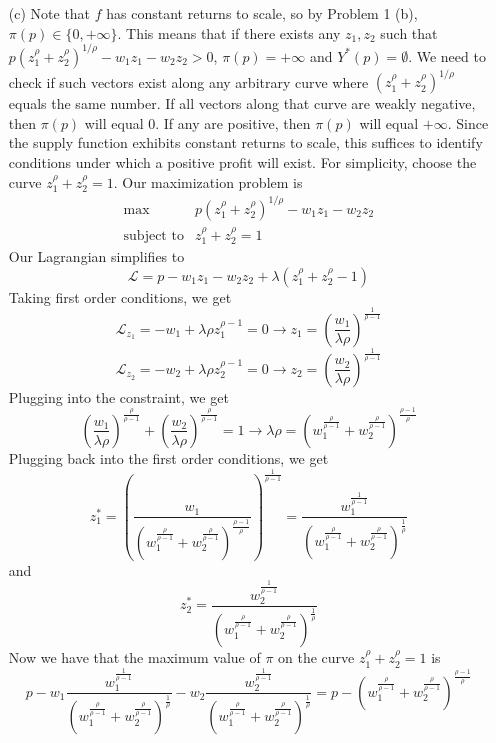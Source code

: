 \documentclass[12pt]{article}
\begin{document}
\begin{itemize}
    \item[(c)] Note that $f$ has constant returns to scale, so by Problem 1 (b), $\pi(p) \in \{0,+\infty\}$. This means that if there exists any $z_1,z_2$ such that $p(z_1^\rho + z_2^\rho)^{1/\rho} - w_1z_1 - w_2z_2 > 0$, $\pi(p) = +\infty$ and $Y^*(p) = \emptyset$. We need to check if such vectors exist along any arbitrary curve where $(z_1^\rho + z_2^\rho)^{1/\rho}$ equals the same number. If all vectors along that curve are weakly negative, then $\pi(p)$ will equal 0. If any are positive, then $\pi(p)$ will equal $+\infty$. Since the supply function exhibits constant returns to scale, this suffices to identify conditions under which a positive profit will exist. For simplicity, choose the curve $z_1^\rho + z_2^\rho = 1$. Our maximization problem is
    \[
    \begin{array}{ll}
        \text{max} & p(z_1^\rho + z_2^\rho)^{1/\rho} - w_1z_1 - w_2z_2 \\
        \text{subject to} & z_1^\rho + z_2^\rho = 1
    \end{array}
    \]
    Our Lagrangian simplifies to
    \[
    \mathcal{L} = p - w_1z_1 - w_2z_2 + \lambda(z_1^\rho + z_2^\rho - 1)
    \]
    Taking first order conditions, we get
    \[
    \mathcal{L}_{z_1} = -w_1 + \lambda \rho z_1^{\rho - 1} = 0 \to z_1 = \left( \frac{w_1}{\lambda \rho}\right)^{\frac{1}{\rho - 1}}
    \]
    \[
    \mathcal{L}_{z_2} = -w_2 + \lambda \rho z_2^{\rho - 1} = 0 \to z_2 = \left( \frac{w_2}{\lambda \rho}\right)^{\frac{1}{\rho - 1}}
    \]
    Plugging into the constraint, we get
    \[
    \left( \frac{w_1}{\lambda \rho}\right)^{\frac{\rho}{\rho - 1}} + \left( \frac{w_2}{\lambda \rho}\right)^{\frac{\rho}{\rho - 1}} = 1 \to \lambda \rho = \left(w_1^{\frac{\rho}{\rho - 1}} + w_2^{\frac{\rho}{\rho - 1}} \right)^{\frac{\rho-1}{\rho}}
    \]
    Plugging back into the first order conditions, we get
    \[
    z_1^* = \left( \frac{w_1}{\left(w_1^{\frac{\rho}{\rho - 1}} + w_2^{\frac{\rho}{\rho - 1}} \right)^{\frac{\rho-1}{\rho}}}\right)^{\frac{1}{\rho - 1}} = \frac{w_1^{\frac{1}{\rho - 1}}}{\left(w_1^{\frac{\rho}{\rho - 1}} + w_2^{\frac{\rho}{\rho - 1}} \right)^{\frac{1}{\rho}}}
    \]
    and
    \[
    z_2^* = \frac{w_2^{\frac{1}{\rho - 1}}}{\left(w_1^{\frac{\rho}{\rho - 1}} + w_2^{\frac{\rho}{\rho - 1}} \right)^{\frac{1}{\rho}}}
    \]
    Now we have that the maximum value of $\pi$ on the curve $z_1^\rho + z_2^\rho = 1$ is
    \[
    p - w_1 \frac{w_1^{\frac{1}{\rho - 1}}}{\left(w_1^{\frac{\rho}{\rho - 1}} + w_2^{\frac{\rho}{\rho - 1}} \right)^{\frac{1}{\rho}}} - w_2 \frac{w_2^{\frac{1}{\rho - 1}}}{\left(w_1^{\frac{\rho}{\rho - 1}} + w_2^{\frac{\rho}{\rho - 1}} \right)^{\frac{1}{\rho}}} = p - \left(w_1^{\frac{\rho}{\rho - 1}} + w_2^{\frac{\rho}{\rho - 1}} \right)^{\frac{\rho - 1}{\rho}}
\]
\end{itemize}
\end{document}
